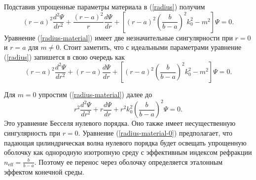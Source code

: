 \documentclass[12pt]{article}
\begin{document}
Подставив упрощенные параметры материала в (\ref{radius}) получим
\begin{equation}\label{radius-material}
  \left(r - a\right)^2 \frac{d^2 \Psi}{d r^2}
  + \frac{\left(r - a\right)^2}{r} \frac{d \Psi}{d r}
  + \left[\left(r - a\right)^2 \left(\frac{b}{b - a}\right)^2 k_0^2 -
    m^2\right] \Psi
  = 0.
\end{equation}
Уравнение (\ref{radius-material}) имеет две незначительные
сингулярности при $r = 0$ и $r = a$ для $m \ne 0$. Стоит заметить, что
с идеальными параметрами уравнение (\ref{radius}) запишется в свою
очередь как
\begin{equation}\label{radius-ideal}
  \left(r - a\right)^2 \frac{d^2 \Psi}{d r^2}
  + \left(r - a\right) \frac{d \Psi}{d r}
  + \left[\left(r - a\right)^2 \left(\frac{b}{b - a}\right)^2 k_0^2 -
    m^2\right] \Psi
  = 0.
\end{equation}

Для $m = 0$ упростим (\ref{radius-material}) далее до
\begin{equation}\label{radius-material-0}
  r^2 \frac{d^2 \Psi}{d r^2}
  + r \frac{d \Psi}{d r}
  + r^2  k_0^2 \left(\frac{b}{b - a}\right)^2 \Psi
  = 0.
\end{equation}
Это уравнение Бесселя нулевого порядка. Оно также имеет несущественную
сингулярность при $r = 0$. Уравнение (\ref{radius-material-0})
предполагает, что падающая цилиндрическая волна нулевого порядка будет
освещать упрощенную оболочку как однородную изотропную среду с
эффективным индексом рефракции $n_{\mathrm {eff}} = \frac{b}{b - a}$.
Поэтому ее перенос через оболочку определяется эталонным эффектом
конечной среды.
\end{document}
